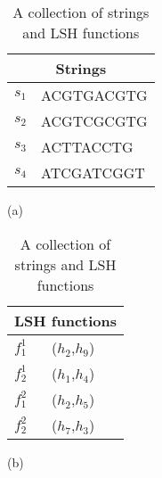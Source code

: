\begin{table}[t]
\centering
\begin{minipage}[]{0.3\textwidth}
\centering
\begin{tabular}{ |l|l| }
  \hline
  \multicolumn{2}{|c|}{Strings} \\
  \hline
  $s_1$ & ACGTGACGTG \\
  $s_2$ & ACGTCGCGTG\\
  $s_3$ & ACTTACCTG \\
  $s_4$ & ATCGATCGGT\\
  \hline
\end{tabular}
\centerline{(a)}
\end{minipage}
\begin{minipage}[]{0.3\textwidth}
\centering
\begin{tabular}{ |l|l| }
  \hline
  \multicolumn{2}{|c|}{LSH functions } \\
  \hline
  $f_1^1$ & ($h_2$,$h_9$) \\   \hline
  $f_2^1$ &  ($h_1$,$h_4$) \\   \hline
  $f_1^2$ &  ($h_2$,$h_5$)  \\   \hline
  $f_2^2$ &  ($h_7$,$h_3$) \\
  \hline
\end{tabular}
\centerline{(b)}
\end{minipage}
\medskip
\caption{A collection of strings and LSH functions}  
\label{tab:strs}
\end{table}



